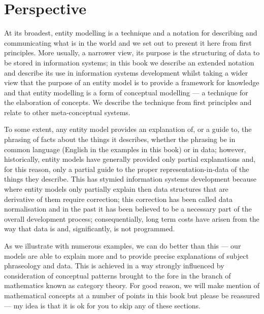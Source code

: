 \section{Perspective}
\label{Perspective}
At its broadest, entity modelling is a technique and a notation for describing and communicating what is in the world and we set out to present it here from first principles. More usually, a narrower view, its purpose is the structuring of data to be stored in information systems; in this book we describe an extended notation and describe its use in information systems development
whilst taking a
 wider view that the purpose of an entity model is to provide a framework for knowledge and that entity modelling is a form of conceptual modelling --- a technique for the elaboration of concepts. We describe the technique from first principles and relate to other meta-conceptual systems. 

To some extent, any entity model provides an explanation of, or a guide to, 
the phrasing of facts about the things it describes, whether the phrasing be in common language
(English in the examples in this book) or in data;
however, historically, entity models have generally 
provided only  partial explanations and, for this reason, 
only a partial guide to the proper representation-in-data of the things they describe.
This has stymied information systems development because where entity models only partially
explain then data structures that are derivative of them require correction; 
this correction has been called data normalisation and 
in the past it has been believed to be a necessary part of the overall development process; consequentially, long term costs  have arisen from the way that data is and, significantly, is not programmed.

As we illustrate with numerous examples, we can do better than this ---
our models are able to explain more and to provide 
precise explanations of subject phraseology and data. 
This is achieved in a way strongly influenced by consideration of conceptual patterns
brought to the fore in the branch of mathematics known as category theory. 
For good reason, we will make mention of mathematical concepts at a number of points in this book
but please be reassured --- my idea is that it is ok for you to skip any of these sections. 

